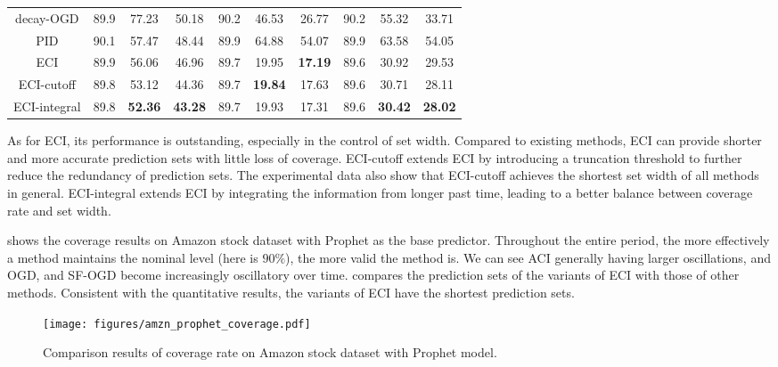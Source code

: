 \begin{table}[ht]
\begin{center}
\begin{tabular}{c|ccc|ccc|ccc}
decay-OGD             & 89.9 & 77.23          & 50.18          & 90.2 & 46.53          & 26.77          & 90.2 & 55.32          & 33.71          \\
PID                   & 90.1 & 57.47          & 48.44          & 89.9 & 64.88          & 54.07          & 89.9 & 63.58          & 54.05          \\
ECI                   & 89.9 & 56.06          & 46.96          & 89.7 & 19.95          & \textbf{17.19} & 89.6 & 30.92          & 29.53          \\
ECI-cutoff            & 89.8 & 53.12          & 44.36          & 89.7 & \textbf{19.84} & 17.63          & 89.6 & 30.71          & 28.11          \\
ECI-integral          & 89.8 & \textbf{52.36} & \textbf{43.28} & 89.7 & 19.93          & 17.31          & 89.6 & \textbf{30.42} & \textbf{28.02}  \\ \hline
\end{tabular}
\end{center}
\vspace{-1em}
\end{table}


As for ECI, its performance is outstanding, especially in the control of set width. Compared to existing methods, ECI can provide shorter and more accurate prediction sets with little loss of coverage. ECI-cutoff extends ECI by introducing a truncation threshold to further reduce the redundancy of prediction sets. The experimental data also show that ECI-cutoff achieves the shortest set width of all methods in general. ECI-integral extends ECI by integrating the information from longer past time, leading to a better balance between coverage rate and set width.

 shows the coverage results on Amazon stock dataset with Prophet as the base predictor. Throughout the entire period, the more effectively a method maintains the nominal level (here is $90\%$), the more valid the method is. We can see ACI generally having larger oscillations, and OGD, and SF-OGD become increasingly oscillatory over time.  compares the prediction sets of the variants of ECI with those of other methods. Consistent with the quantitative results, the variants of ECI have the shortest prediction sets.

\vspace{-0.9em}
\begin{figure*}[ht]
  \centering
  \texttt{[image: figures/amzn\_prophet\_coverage.pdf]}
  \vspace{-0.5em}
  \caption{Comparison results of coverage rate on Amazon stock dataset with Prophet model.}
  \vspace{-0.5em}
  \label{figure amazon prophet coverage}
\end{figure*}


